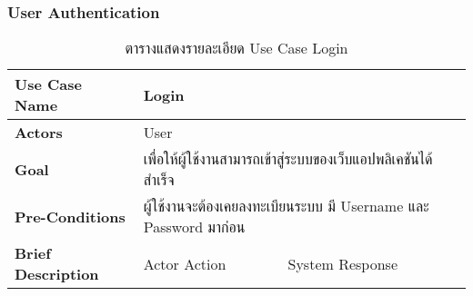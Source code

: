 \documentclass[12pt,oneside,openright,a4paper]{cpe-thai-project}
\begin{document}
\subsubsection{User Authentication}
\begin{table}[!h]
\caption{ตารางแสดงรายละเอียด Use Case Login}\label{tbl:table3.10}
\begin{tabular}{|l|ll|}
\hline
\textbf{Use Case Name}     & \multicolumn{2}{l|}{Login}                                                                                                                                                                                                                                                                                                                                      \\ \hline
\textbf{Actors}            & \multicolumn{2}{l|}{User}                                                                                                                                                                                                                                                                                                                                       \\ \hline
\textbf{Goal}              & \multicolumn{2}{l|}{เพื่อให้ผู้ใช้งานสามารถเข้าสู่ระบบของเว็บแอปพลิเคชันได้สำเร็จ}                                                                                                                                                                                                                                                                              \\ \hline
\textbf{Pre-Conditions}    & \multicolumn{2}{l|}{ผู้ใช้งานจะต้องเคยลงทะเบียนระบบ มี Username และ Password มาก่อน}                                                                                                                                                                                                                                                                            \\ \hline
\textbf{Brief Description} & \multicolumn{1}{l|}{Actor Action}                                                                                                                                                         & System Response                                                                                                                                                     \\ \hline

\end{tabular}
\end{table}
\end{document}
